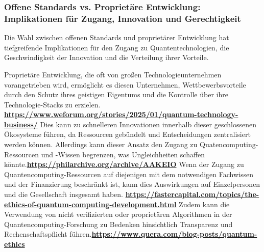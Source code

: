 {\subsubsection{\textbf{Offene Standards vs. Proprietäre Entwicklung: Implikationen für Zugang, Innovation und Gerechtigkeit}}

Die Wahl zwischen offenen Standards und proprietärer Entwicklung hat tiefgreifende Implikationen für den Zugang zu Quantentechnologien, die Geschwindigkeit der Innovation und die Verteilung ihrer Vorteile.

Proprietäre Entwicklung, die oft von großen Technologieunternehmen vorangetrieben wird, ermöglicht es diesen Unternehmen, Wettbewerbsvorteile durch den Schutz ihres geistigen Eigentums und die Kontrolle über ihre Technologie-Stacks zu erzielen. \textbf{\href{https://www.weforum.org/stories/2025/01/quantum-technology-business/}{https://www.weforum.org/stories/2025/01/quantum-technology-business/}} Dies kann zu schnelleren Innovationen innerhalb dieser geschlossenen Ökosysteme führen, da Ressourcen gebündelt und Entscheidungen zentralisiert werden können. Allerdings kann dieser Ansatz den Zugang zu Quatencomputing-Ressourcen und -Wissen begrenzen, was Ungleichheiten schaffen könnte.\textbf{\href{https://philarchive.org/archive/AAKEIO}{https://philarchive.org/archive/AAKEIO}} Wenn der Zugang zu Quantencomputing-Ressourcen auf diejenigen mit dem notwendigen Fachwissen und der Finanzierung beschränkt ist, kann dies Auswirkungen auf Einzelpersonen und die Gesellschaft insgesamt haben. \textbf{\href{https://fastercapital.com/topics/the-ethics-of-quantum-computing-development.html}{https://fastercapital.com/topics/the-ethics-of-quantum-computing-development.html}} Zudem kann die Verwendung von nicht verifizierten oder proprietären Algorithmen in der Quantencomputing-Forschung zu Bedenken hinsichtlich Transparenz und Rechenschaftspflicht führen.\textbf{\href{https://www.quera.com/blog-posts/quantum-ethics}{https://www.quera.com/blog-posts/quantum-ethics}}

}
